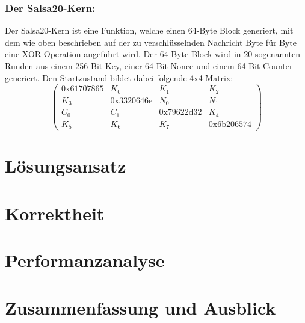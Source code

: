 \documentclass[course=erap]{aspdoc}
\begin{document}
\subsubsection{Der Salsa20-Kern:}
Der Salsa20-Kern ist eine Funktion, welche einen 64-Byte Block generiert, mit dem wie oben beschrieben auf der zu verschlüsselnden Nachricht Byte für Byte eine XOR-Operation augeführt wird.
Der 64-Byte-Block wird in 20 sogenannten Runden aus einem 256-Bit-Key, einer 64-Bit Nonce und einem 64-Bit Counter generiert.
Den Startzustand bildet dabei folgende 4x4 Matrix:
\[
    \begin{pmatrix}
    0\text{x}61707865 & K_0 & K_1 & K_2\\
    K_3 & 0\text{x}3320646\text{e} & N_0 & N_1\\
    C_0 & C_1 & 0\text{x}79622\text{d}32 & K_4\\
    K_5 & K_6 & K_7 & 0\text{x}6\text{b}206574
    \end{pmatrix}
\]



\section{Lösungsansatz}


\section{Korrektheit}


\section{Performanzanalyse}


\section{Zusammenfassung und Ausblick}


{}
\end{document}
